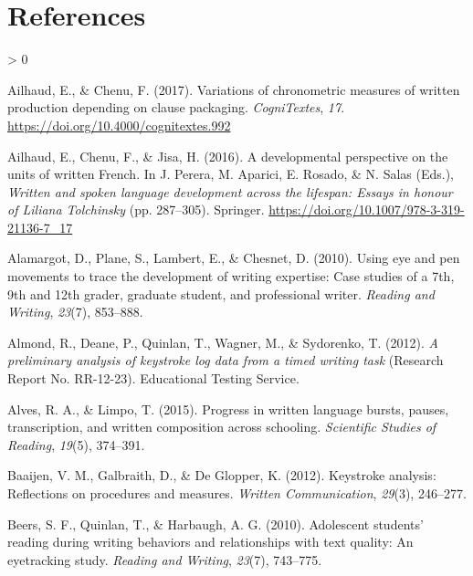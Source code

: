 \documentclass[
  english,
  man,floatsintext]{apa7}
\newlength{\cslhangindent}
\newenvironment{CSLReferences}[2] %
 {%
  \setlength{\parindent}{0pt}
  \ifodd #1 \everypar{\setlength{\hangindent}{\cslhangindent}}\ignorespaces\fi
  \ifnum #2 > 0
  \setlength{\parskip}{#2\baselineskip}
  \fi
 }%
 {}
\begin{document}
\hypertarget{references}{%
\section{References}\label{references}}

\begingroup
\setlength{\parindent}{-0.5in}
\setlength{\leftskip}{0.5in}

\hypertarget{references}{}

\endgroup

\hypertarget{refs}{}
\begin{CSLReferences}{1}{0}
\leavevmode\hypertarget{ref-ailhaud2018variations}{}%
Ailhaud, E., \& Chenu, F. (2017). Variations of chronometric measures of written production depending on clause packaging. \emph{CogniTextes}, \emph{17}. \url{https://doi.org/10.4000/cognitextes.992}

\leavevmode\hypertarget{ref-ailhaud2016developmental}{}%
Ailhaud, E., Chenu, F., \& Jisa, H. (2016). A developmental perspective on the units of written {F}rench. In J. Perera, M. Aparici, E. Rosado, \& N. Salas (Eds.), \emph{Written and spoken language development across the lifespan: Essays in honour of {Liliana Tolchinsky}} (pp. 287--305). Springer. \url{https://doi.org/10.1007/978-3-319-21136-7_17}

\leavevmode\hypertarget{ref-alamargot2010using}{}%
Alamargot, D., Plane, S., Lambert, E., \& Chesnet, D. (2010). Using eye and pen movements to trace the development of writing expertise: Case studies of a 7th, 9th and 12th grader, graduate student, and professional writer. \emph{Reading and Writing}, \emph{23}(7), 853--888.

\leavevmode\hypertarget{ref-almond2012preliminary}{}%
Almond, R., Deane, P., Quinlan, T., Wagner, M., \& Sydorenko, T. (2012). \emph{A preliminary analysis of keystroke log data from a timed writing task} (Research Report No. RR-12-23). Educational Testing Service.

\leavevmode\hypertarget{ref-alves2015progress}{}%
Alves, R. A., \& Limpo, T. (2015). Progress in written language bursts, pauses, transcription, and written composition across schooling. \emph{Scientific Studies of Reading}, \emph{19}(5), 374--391.

\leavevmode\hypertarget{ref-baaijen2012keystroke}{}%
Baaijen, V. M., Galbraith, D., \& De Glopper, K. (2012). Keystroke analysis: Reflections on procedures and measures. \emph{Written Communication}, \emph{29}(3), 246--277.

\leavevmode\hypertarget{ref-beers2010adolescent}{}%
Beers, S. F., Quinlan, T., \& Harbaugh, A. G. (2010). Adolescent students' reading during writing behaviors and relationships with text quality: An eyetracking study. \emph{Reading and Writing}, \emph{23}(7), 743--775.


\end{CSLReferences}
\end{document}
